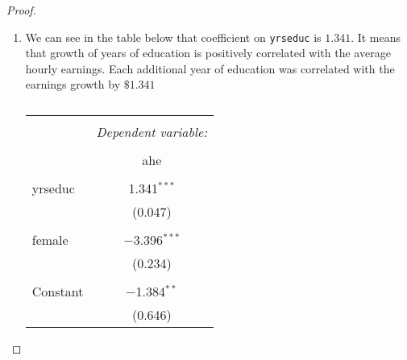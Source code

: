 \documentclass[12pt,reqno]{amsart}
\theoremstyle{plain}
\begin{document}
\begin{proof}
    \begin{enumerate}
        \item We can see in the table below that coefficient on \texttt{yrseduc} is $ 1.341 $. It means
              that growth of years of education is positively correlated with the average hourly earnings.
              Each additional year of education was correlated with the earnings growth by $ \$ 1.341 $
              \begin{table}[!htbp] \centering
                  \caption{}
                  \label{}
                  \begin{tabular}{@{\extracolsep{5pt}}lc}
                      \\[-1.8ex]\hline
                      \hline                                                                                     \\[-1.8ex]
                                          & \multicolumn{1}{c}{\textit{Dependent variable:}}                     \\
                      \cline{2-2}
                      \\[-1.8ex] & ahe \\
                      \hline                                                                                     \\[-1.8ex]
                      yrseduc             & 1.341$^{***}$                                                        \\
                                          & (0.047)                                                              \\
                                          &                                                                      \\
                      female              & $-$3.396$^{***}$                                                     \\
                                          & (0.234)                                                              \\
                                          &                                                                      \\
                      Constant            & $-$1.384$^{**}$                                                      \\
                                          & (0.646)                                                              \\

\end{tabular}
\end{table}
\end{enumerate}
\end{proof}
\end{document}
